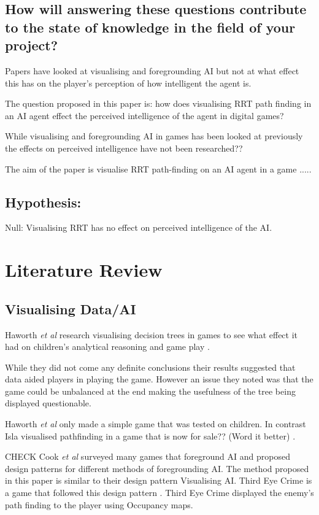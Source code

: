 \documentclass[journal]{IEEEtran}
\begin{document}
\subsection{How will answering these questions contribute to the state of knowledge in the field of your project?}
Papers have looked at visualising and foregrounding AI but not at what effect this has on the player's perception of how intelligent the agent is.

The question proposed in this paper is: how does visualising RRT path finding in an AI agent effect the perceived intelligence of the agent in digital games?  

While visualising and foregrounding AI in games has been looked at previously \cite{} the effects on perceived intelligence have not been researched??

The aim of the paper is visualise RRT path-finding on an AI agent in a game .....


\subsection{Hypothesis:}
Null: Visualising RRT has no effect on perceived intelligence of the AI.


\section{Literature Review}
\subsection{Visualising Data/AI}

Haworth \textit{et al} research visualising decision trees in games to see what effect it had on children's analytical reasoning and game play \cite{Haworth2010}. 

While they did not come any definite conclusions their results suggested that data aided players in playing the game. However an issue they noted was that the game could be unbalanced at the end making the usefulness of the tree being displayed questionable.  

Haworth \textit{et al} only made a simple game that was tested on children. In contrast Isla visualised pathfinding in a game that is now for sale?? (Word it better) \cite{Isla2014}.
 
 
 CHECK Cook \textit{et al} surveyed many games that foreground AI and proposed design patterns for different methods of foregrounding AI.  The method proposed in this paper is similar to their design pattern Visualising AI.  
 Third Eye Crime is a game that followed this design pattern \cite{Isla2014}.  Third Eye Crime displayed the enemy's path finding to the player using Occupancy maps. 
 
\end{document}
